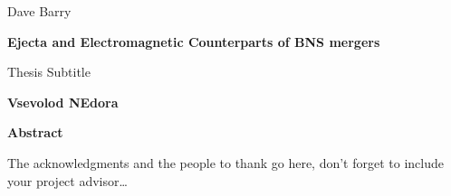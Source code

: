 \documentclass[
openright,
12pt, %
english,%
onehalfspacing, %
nolistspacing, %
nohyperref, %
headsepline, %
]{MastersDoctoralThesis} %
\begin{document}
\hfill Dave Barry
\cleardoublepage

\begin{center}
    \Large
    \textbf{Ejecta and Electromagnetic Counterparts of BNS mergers}
    
    \vspace{0.4cm}
    \large
    Thesis Subtitle
    
    \vspace{0.4cm}
    \textbf{Vsevolod NEdora}
    
    \vspace{0.9cm}
    \textbf{Abstract}
\end{center}


\begin{acknowledgements}
    \addchaptertocentry{\acknowledgementname} %
    The acknowledgments and the people to thank go here, don't forget to include your project advisor\ldots
\end{acknowledgements}





\end{document}
